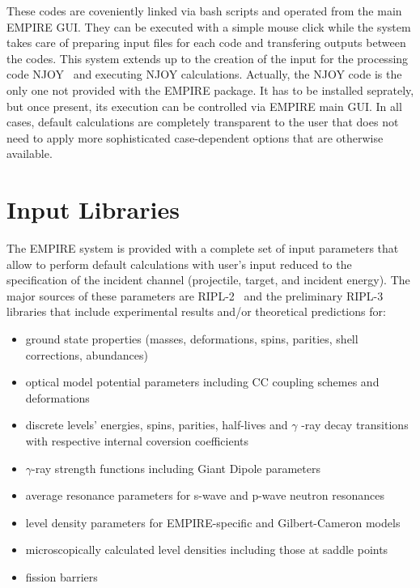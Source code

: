 These codes are coveniently linked via bash scripts and operated from the
main EMPIRE GUI. They can be executed with a simple mouse click while the
system takes care of preparing input files for each code and transfering
outputs between the codes. This system extends up to the creation of the
input for the processing code NJOY~\cite{NJOY} and executing NJOY calculations.
Actually, the NJOY code is the only one not provided with the EMPIRE package.
It has to be installed seprately, but once present, its execution can be controlled via EMPIRE main GUI. In all cases, default calculations are completely transparent to the user that does not need to apply more sophisticated case-dependent options that are otherwise available.



\section{Input Libraries}

The EMPIRE system is provided with a complete set of input parameters that
allow to perform default calculations with user's input reduced to the
specification of the incident channel (projectile, target, and incident
energy). The major sources of these parameters are RIPL-2~\cite{ripl2} and
the preliminary RIPL-3 libraries that include experimental results and/or
theoretical predictions for:

\begin{itemize}
\item ground state properties (masses, deformations, spins, parities, shell
corrections, abundances)

\item optical model potential parameters including CC coupling schemes and
deformations

\item discrete levels' energies, spins, parities, half-lives and $\gamma$%
-ray decay transitions with respective internal coversion coefficients

\item $\gamma$-ray strength functions including Giant Dipole parameters

\item average resonance parameters for s-wave and p-wave neutron resonances

\item level density parameters for EMPIRE-specific and Gilbert-Cameron models

\item microscopically calculated level densities including those at saddle
points

\item fission barriers
\end{itemize}

